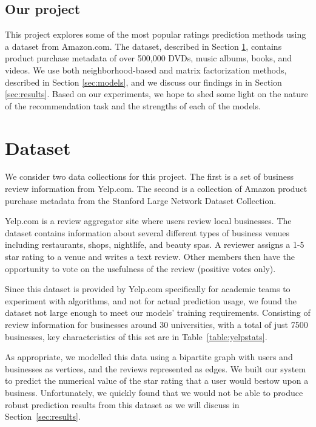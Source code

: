\documentclass[letterpaper, 10 pt, twocolumn]{article}
\begin{document}
\subsection{Our project}
This project explores some of the most popular ratings prediction methods using 
a dataset from Amazon.com. The dataset, described in Section 
\ref{sec:dataset}, contains product purchase metadata of over 500,000 DVDs, 
music albums, books, and videos. We use both neighborhood-based and 
matrix factorization methods, described in Section \ref{sec:models}, and we 
discuss our findings in in Section \ref{sec:results}. Based on our 
experiments, we hope to shed some light on the nature of the recommendation 
task and the strengths of each of the models.


\section{Dataset}
\label{sec:dataset}
We consider two data collections for this project. The first is a set of business
review information from Yelp.com. The second is a collection of Amazon product 
purchase metadata from the Stanford Large Network Dataset Collection.

Yelp.com is a review aggregator site where users review local
businesses. The dataset contains information about several different types of
business venues including restaurants, shops,
nightlife, and beauty spas. A reviewer assigns a 1-5 star rating to a venue and
writes a text review. Other members then have the opportunity to vote on the
usefulness of the review (positive votes only).

Since this dataset is provided by Yelp.com specifically for academic teams to
experiment with algorithms, and not for actual prediction usage, we found the
dataset not large enough to meet our models' training requirements.
Consisting of review information for businesses around 30 universities,
with a total of just 7500 businesses, key characteristics of this set
are in Table~\ref{table:yelpstats}.

As appropriate, we modelled this data using a bipartite graph with users and
businesses as vertices, and the reviews represented as edges.
We built our system to predict the numerical value of the star
rating that a user would bestow upon a business. Unfortunately, we quickly
found that we would not be able to produce robust prediction results from
this dataset as we will discuss in Section~\ref{sec:results}.
\end{document}
